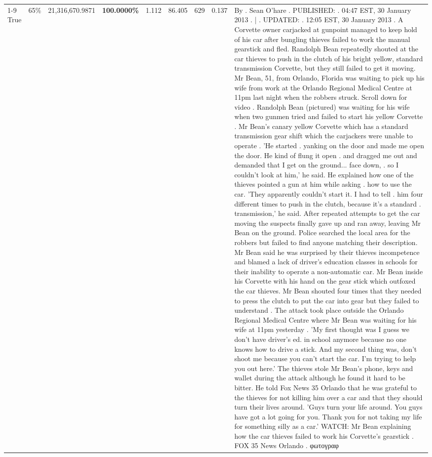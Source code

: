 \begin{table}[H]
\begin{tabular}{lllrlllll}
\cline{1-9} \cline{2-9}
True & 65\% & 21,316,670.9871 & \bfseries \color{red} 100.0000\% & 1.112 & 86.405 & 629 & 0.137 & By . Sean O'hare . PUBLISHED: . 04:47 EST, 30 January 2013 . | . UPDATED: . 12:05 EST, 30 January 2013 . A Corvette owner carjacked at gunpoint managed to keep hold of his car after bungling thieves failed to work the manual gearstick and fled. Randolph Bean repeatedly shouted at the car thieves to push in the clutch of his bright yellow, standard transmission Corvette, but they still failed to get it moving. Mr Bean, 51, from Orlando, Florida was waiting to pick up his wife from work at the Orlando Regional Medical Centre at 11pm last night when the robbers struck. Scroll down for video . Randolph Bean (pictured) was waiting for his wife when two gunmen tried and failed to start his yellow Corvette . Mr Bean's canary yellow Corvette which has a standard transmission gear shift which the carjackers were unable to operate . 'He started . yanking on the door and made me open the door. He kind of flung it open . and dragged me out and demanded that I get on the ground... face down, . so I couldn't look at him,' he said. He explained how one of the thieves pointed a gun at him while asking . how to use the car. 'They apparently couldn't start it. I had to tell . him four different times to push in the clutch, because it's a standard . transmission,' he said. After repeated attempts to get the car moving the suspects finally gave up and ran away, leaving Mr Bean on the ground. Police searched the local area for the robbers but failed to find anyone matching their description. Mr Bean said he was surprised by their thieves incompetence and blamed a lack of driver's education classes in schools for their inability to operate a non-automatic car. Mr Bean inside his Corvette with his hand on the gear stick which outfoxed the car thieves. Mr Bean shouted four times that they needed to press the clutch to put the car into gear but they failed to understand . The attack took place outside the Orlando Regional Medical Centre where Mr Bean was waiting for his wife at 11pm yesterday . 'My first thought was I guess we don't have driver's ed. in school anymore because no one knows how to drive a stick. And my second thing was, don't shoot me because you can't start the car. I'm trying to help you out here.' The thieves stole Mr Bean's phone, keys and wallet during the attack although he found it hard to be bitter. He told Fox News 35 Orlando that he was grateful to the thieves for not killing him over a car and that they should turn their lives around. 'Guys turn your life around. You guys have got a lot going for you. Thank you for not taking my life for something silly as a car.' WATCH: Mr Bean explaining how the car thieves failed to work his Corvette's gearstick . FOX 35 News Orlando . φωτογραφ \\

\end{tabular}
\end{table}
